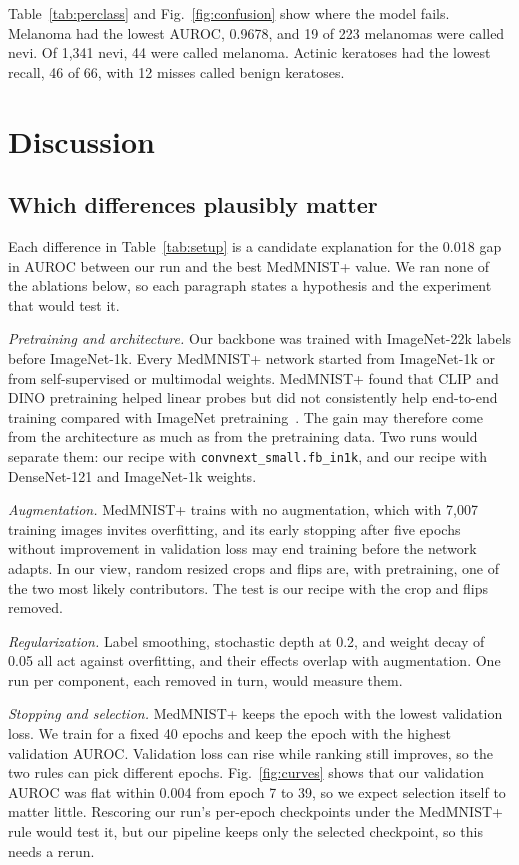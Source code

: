 \documentclass[conference]{IEEEtran}
\begin{document}
Table~\ref{tab:perclass} and Fig.~\ref{fig:confusion} show where the model fails. Melanoma had the lowest AUROC, 0.9678, and 19 of 223 melanomas were called nevi. Of 1,341 nevi, 44 were called melanoma. Actinic keratoses had the lowest recall, 46 of 66, with 12 misses called benign keratoses.

\section{Discussion}

\subsection{Which differences plausibly matter}

Each difference in Table~\ref{tab:setup} is a candidate explanation for the 0.018 gap in AUROC between our run and the best MedMNIST+ value. We ran none of the ablations below, so each paragraph states a hypothesis and the experiment that would test it.

\emph{Pretraining and architecture.} Our backbone was trained with ImageNet-22k labels before ImageNet-1k. Every MedMNIST+ network started from ImageNet-1k or from self-supervised or multimodal weights. MedMNIST+ found that CLIP and DINO pretraining helped linear probes but did not consistently help end-to-end training compared with ImageNet pretraining~\cite{doerrich2025medmnistplus}. The gain may therefore come from the architecture as much as from the pretraining data. Two runs would separate them: our recipe with \texttt{convnext\_small.fb\_in1k}, and our recipe with DenseNet-121 and ImageNet-1k weights.

\emph{Augmentation.} MedMNIST+ trains with no augmentation, which with 7,007 training images invites overfitting, and its early stopping after five epochs without improvement in validation loss may end training before the network adapts. In our view, random resized crops and flips are, with pretraining, one of the two most likely contributors. The test is our recipe with the crop and flips removed.

\emph{Regularization.} Label smoothing, stochastic depth at 0.2, and weight decay of 0.05 all act against overfitting, and their effects overlap with augmentation. One run per component, each removed in turn, would measure them.

\emph{Stopping and selection.} MedMNIST+ keeps the epoch with the lowest validation loss. We train for a fixed 40 epochs and keep the epoch with the highest validation AUROC. Validation loss can rise while ranking still improves, so the two rules can pick different epochs. Fig.~\ref{fig:curves} shows that our validation AUROC was flat within 0.004 from epoch 7 to 39, so we expect selection itself to matter little. Rescoring our run's per-epoch checkpoints under the MedMNIST+ rule would test it, but our pipeline keeps only the selected checkpoint, so this needs a rerun.
\end{document}

